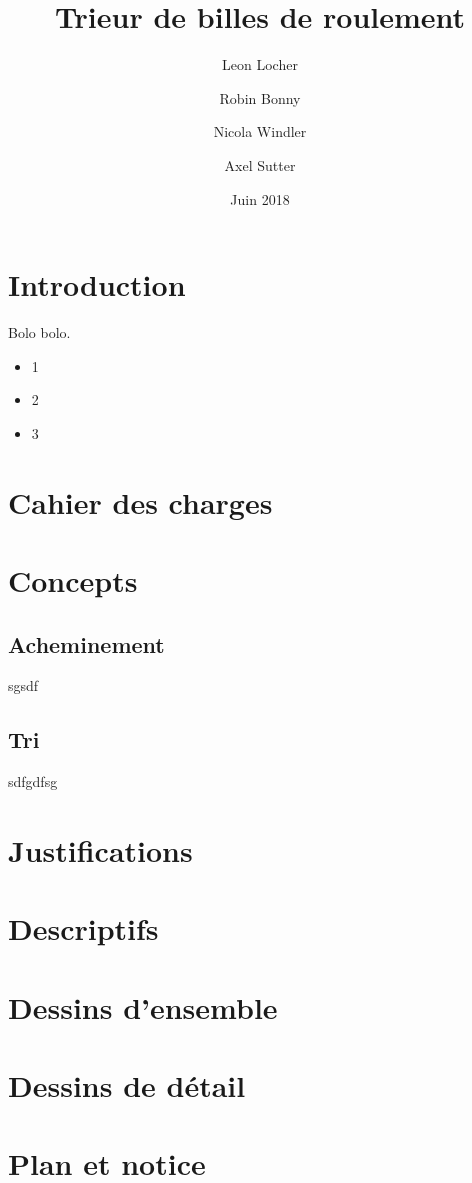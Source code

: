 \documentclass[french,a4paper,11pt]{article}
\title{Trieur de billes de roulement}
\author{Leon Locher \and Robin Bonny \and Nicola Windler \and Axel Sutter}
\date{Juin 2018}
\begin{document}
\maketitle

\tableofcontents

\section{Introduction}
Bolo bolo.

\begin{itemize}
    \item 1
    \item 2
    \item 3
\end{itemize}

\section{Cahier des charges}


\section{Concepts}
\subsection{Acheminement}
sgsdf
\subsection{Tri}
sdfgdfsg
\section{Justifications}

\section{Descriptifs}

\section{Dessins d'ensemble}

\section{Dessins de détail}

\section{Plan et notice}
\end{document}
